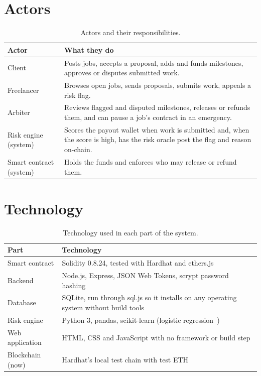 \section{Actors}
\begin{table}[htbp]
\centering
\small
\begin{tabularx}{\textwidth}{>{\raggedright\arraybackslash}p{3.2cm}L}
\hline
\textbf{Actor} & \textbf{What they do} \\ \hline
Client & Posts jobs, accepts a proposal, adds and funds milestones, approves or disputes submitted work. \\
Freelancer & Browses open jobs, sends proposals, submits work, appeals a risk flag. \\
Arbiter & Reviews flagged and disputed milestones, releases or refunds them, and can pause a job's contract in an emergency. \\
Risk engine (system) & Scores the payout wallet when work is submitted and, when the score is high, has the risk oracle post the flag and reason on-chain. \\
Smart contract (system) & Holds the funds and enforces who may release or refund them. \\ \hline
\end{tabularx}
\caption{Actors and their responsibilities.}
\label{tab:actors}
\end{table}

\section{Technology}
\begin{table}[htbp]
\centering
\small
\begin{tabularx}{\textwidth}{>{\raggedright\arraybackslash}p{3.2cm}L}
\hline
\textbf{Part} & \textbf{Technology} \\ \hline
Smart contract & Solidity 0.8.24, tested with Hardhat and ethers.js \\
Backend & Node.js, Express, JSON Web Tokens, scrypt password hashing \\
Database & SQLite, run through sql.js so it installs on any operating system without build tools \\
Risk engine & Python 3, pandas, scikit-learn (logistic regression~\cite{hosmer,sklearn}) \\
Web application & HTML, CSS and JavaScript with no framework or build step \\
Blockchain (now) & Hardhat's local test chain with test ETH \\ \hline
\end{tabularx}
\caption{Technology used in each part of the system.}
\label{tab:tech}
\end{table}
